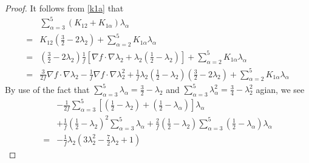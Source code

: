 \documentclass[10pt,a4paper]{amsart}
\begin{document}
\begin{proof}
It follows from \eqref{k1a} that
\begin{equation*}
	\begin{aligned}
		&\sum_{\alpha=3}^5(K_{12}+K_{1\alpha })\lambda_\alpha\\
		=& K_{12}({\frac{3}{2}}-2\lambda_{2})+\sum_{\alpha=2}^5K_{1\alpha}\lambda_\alpha\\
		=&({\frac{3}{2}}-2\lambda_{2})\frac{1}{f}\left[\nabla f\cdot \nabla \lambda_2 +\lambda_2(\frac{1}{2}-\lambda_2) \right]+\sum_{\alpha=2}^5K_{1\alpha}\lambda_\alpha\\
		=&\frac{3}{2f}\nabla f\cdot \nabla \lambda_2-\frac{1}{f}\nabla f\cdot \nabla \lambda_2^2
		+\frac{1}{f}\lambda_2(\frac{1}{2}-\lambda_2)({\frac{3}{2}}-2\lambda_{2})
		+\sum_{\alpha=2}^5K_{1\alpha}\lambda_\alpha
	\end{aligned}
\end{equation*}
By use of the fact that $\sum_{\alpha=3}^5\lambda_\alpha=\frac{3}{2}-\lambda_2$ and $\sum_{\alpha=3}^5\lambda_\alpha^2=\frac{3}{4}-\lambda_2^2$ agian, we see
\begin{equation*}
	\begin{aligned}
		&-{\frac{1}{2f}}\sum_{\alpha=3}^5\left[ ({\frac{1}{2}}-\lambda_{2})+({\frac{1}{2}}-\lambda_{\alpha})\right] \lambda_\alpha\\
		 &+\frac{1}{f}(\frac{1}{2}-\lambda_{2})^2\sum_{\alpha=3}^5\lambda_{\alpha}+\frac{2}{f}({\frac{1}{2}}-\lambda_{2})\sum_{\alpha=3}^5({\frac{1}{2}}-\lambda_{\alpha})\lambda_{\alpha}\\
		=&-\frac{1}{f}\lambda_2\left( 3\lambda^2_2-\frac{7}{2}\lambda_2+1\right)
	\end{aligned}
\end{equation*}



\end{proof}
\end{document}
